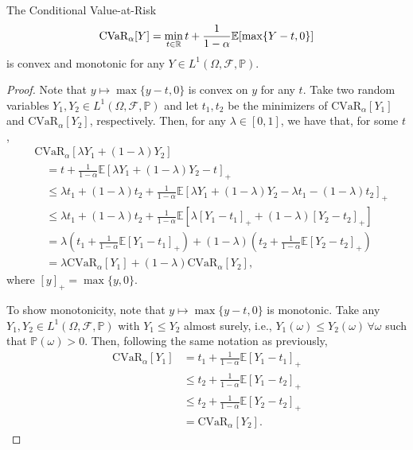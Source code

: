 \documentclass[12pt]{article}
\begin{document}
\begin{prop}\label{prop:cvar}
    The Conditional Value-at-Risk \[
	\text{CVaR}_\alpha[Y] = \min_{t\in \mathbb{R}} t + \frac{1}{1-\alpha} \mathbb{E}[\max\{Y-t,0\}]
    \] is convex and monotonic for any $Y \in L^{1}(\Omega,\mathcal{F},\mathbb{P})$.
\end{prop}
\begin{proof}
    Note that $y \mapsto \max\{y-t,0\}$ is convex on $y$ for any $t$.
    Take two random variables $Y_1,Y_2 \in L^{1}(\Omega,\mathcal{F},\mathbb{P})$ and let $t_1,t_2$ be the minimizers of $\text{CVaR}_{\alpha}[Y_1]$ and $\text{CVaR}_{\alpha}[Y_2]$, respectively.
    Then, for any $\lambda \in [0,1]$, we have that, for some $t$,
    \begin{align*}
	&\text{CVaR}_{\alpha}[\lambda Y_1 + (1-\lambda)Y_2] \\
	&\quad = t + \frac{1}{1-\alpha} \mathbb{E}[\lambda Y_1 + (1-\lambda)Y_2 - t]_{+}  \\
	&\quad \le \lambda t_1 + (1-\lambda)t_2 + \frac{1}{1-\alpha} \mathbb{E}[\lambda Y_1 + (1-\lambda)Y_2 - \lambda t_1 - (1-\lambda)t_2]_{+}  \\
	&\quad \le \lambda t_1 + (1-\lambda)t_2 + \frac{1}{1-\alpha} \mathbb{E}[\lambda [Y_1 - t_1]_{+} + (1-\lambda)[Y_2 - t_2]_{+} ]  \\
	&\quad = \lambda \left( t_1 + \frac{1}{1-\alpha} \mathbb{E}[Y_1 - t_1]_{+} \right)  + (1-\lambda) \left( t_2 + \frac{1}{1-\alpha} \mathbb{E}[Y_2 - t_2]_{+} \right)   \\
	&\quad = \lambda \text{CVaR}_{\alpha}[Y_1] + (1-\lambda)\text{CVaR}_{\alpha}[Y_2]
,\end{align*}
where $[y]_{+} = \max\{y,0\}$.
    
    To show monotonicity, note that $y \mapsto \max\{y-t,0\}$ is monotonic.
    Take any $Y_1,Y_2 \in L^{1}(\Omega,\mathcal{F},\mathbb{P})$ with $Y_1 \le Y_2$ almost surely, i.e., $Y_1(\omega) \le Y_2(\omega)\,\forall \omega$  such that $\mathbb{P}(\omega)>0$.
    Then, following the same notation as previously, 
    \begin{align*}
	\text{CVaR}_{\alpha}[Y_1] &= t_1 + \frac{1}{1-\alpha}\mathbb{E}[Y_1-t_1]_+ \\
	&\le  t_2 + \frac{1}{1-\alpha}\mathbb{E}[Y_1-t_2]_+ \\
	&\le  t_2 + \frac{1}{1-\alpha}\mathbb{E}[Y_2-t_2]_+ \\
	&=  \text{CVaR}_{\alpha}[Y_2]
    .\end{align*}
\end{proof}
\end{document}
